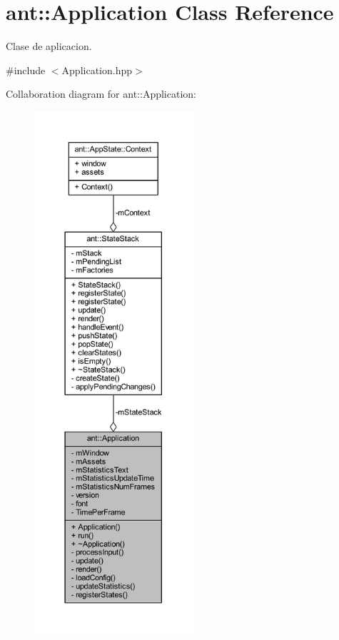 \hypertarget{classant_1_1_application}{\section{ant\+:\+:Application Class Reference}
\label{classant_1_1_application}
}


Clase de aplicacion.  




{\ttfamily \#include $<$Application.\+hpp$>$}



Collaboration diagram for ant\+:\+:Application\+:
\nopagebreak
\begin{figure}[H]
\begin{center}
\leavevmode
\includegraphics[height=550pt]{d4/da3/classant_1_1_application__coll__graph}
\end{center}
\end{figure}
